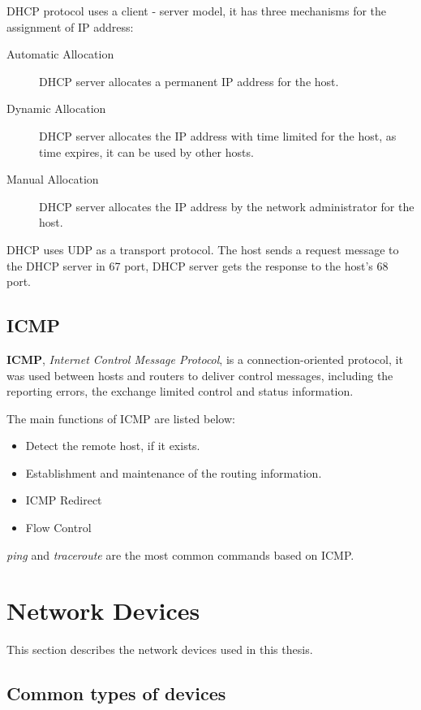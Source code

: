 DHCP protocol uses a client - server model, it has three mechanisms for the assignment of IP address:

\begin{description}
	\item[Automatic Allocation] DHCP server allocates a permanent IP address for the host.
	\item[Dynamic Allocation] DHCP server allocates the IP address with time limited for the host, as time expires, it can be used by other hosts.
	\item[Manual Allocation] DHCP server allocates the IP address by the network administrator for the host.
\end{description}

DHCP uses UDP as a transport protocol. The host sends a request message to the DHCP server in 67 port, DHCP server gets the response to the host's 68 port.

\subsection{ICMP}

\textbf{ICMP}, \textit{Internet Control Message Protocol}, is a connection-oriented protocol, it was used between hosts and routers to deliver control messages, including the reporting errors, the exchange limited control and status information.  

The main functions of ICMP are listed below:

\begin{itemize}
	\item Detect the remote host, if it exists.  
	\item Establishment and maintenance of the routing information.  
	\item ICMP Redirect  
	\item Flow Control
\end{itemize}

\textit{ping} and \textit{traceroute} are the most common commands based on ICMP. 

\section{Network Devices}

This section describes the network devices used in this thesis.

\subsection{Common types of devices}

